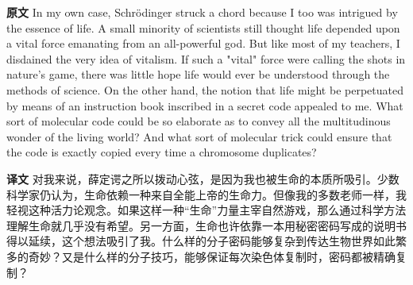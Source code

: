 \documentclass[UTF8,zihao=-4]{ctexart}
\newcommand{\BodyFont}{\fontsize{10.5pt}{15.5pt}\selectfont}
\renewenvironment{quote}{\par\noindent\begingroup\BodyFont}{\par\endgroup}
\begin{document}
\begin{quote}
\noindent\textbf{原文} In my own case, Schrödinger struck a chord because I too was intrigued by the essence of life. A small minority of scientists still thought life depended upon a vital force emanating from an all-powerful god. But like most of my teachers, I disdained the very idea of vitalism. If such a "vital" force were calling the shots in nature's game, there was little hope life would ever be understood through the methods of science. On the other hand, the notion that life might be perpetuated by means of an instruction book inscribed in a secret code appealed to me. What sort of molecular code could be so elaborate as to convey all the multitudinous wonder of the living world? And what sort of molecular trick could ensure that the code is exactly copied every time a chromosome duplicates?

\smallskip
\noindent\textbf{译文} 对我来说，薛定谔之所以拨动心弦，是因为我也被生命的本质所吸引。少数科学家仍认为，生命依赖一种来自全能上帝的生命力。但像我的多数老师一样，我轻视这种活力论观念。如果这样一种“生命”力量主宰自然游戏，那么通过科学方法理解生命就几乎没有希望。另一方面，生命也许依靠一本用秘密密码写成的说明书得以延续，这个想法吸引了我。什么样的分子密码能够复杂到传达生物世界如此繁多的奇妙？又是什么样的分子技巧，能够保证每次染色体复制时，密码都被精确复制？
\end{quote}
\end{document}
